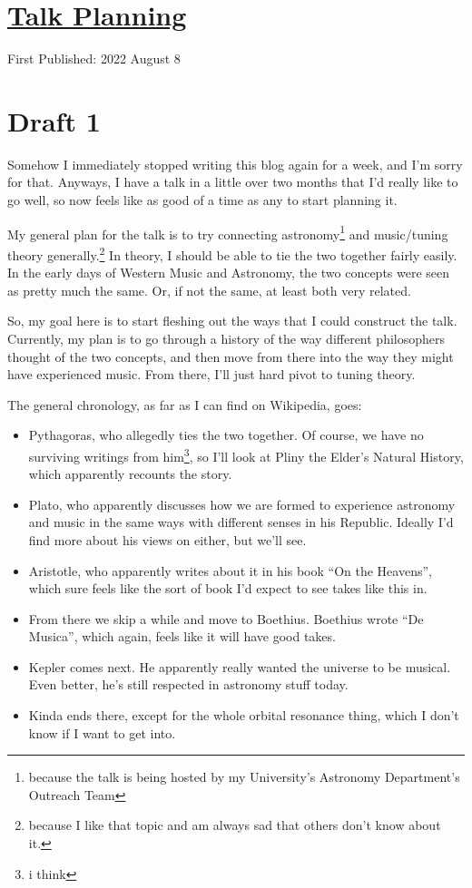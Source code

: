 \documentclass[12pt]{article}[titlepage]
\newcommand{\say}[1]{``#1''}
\newcommand{\1}{\={a}}
\newcommand{\2}{\={e}}
\newcommand{\3}{\={\i}}
\newcommand{\4}{\=o}
\newcommand{\5}{\=u}
\newcommand{\6}{\={A}}
\renewcommand{\,}{\textsuperscript{,}}
\begin{document}
\doublespacing
\section{\href{talk-planning-1.html}{Talk Planning}}
First Published: 2022 August 8
\section{Draft 1}
Somehow I immediately stopped writing this blog again for a week, and I'm sorry for that.
Anyways, I have a talk in a little over two months that I'd really like to go well, so now feels like as good of a time as any to start planning it.

My general plan for the talk is to try connecting astronomy\footnote{because the talk is being hosted by my University's Astronomy Department's Outreach Team} and music/tuning theory generally.\footnote{because I like that topic and am always sad that others don't know about it.}
In theory, I should be able to tie the two together fairly easily.
In the early days of Western Music and Astronomy, the two concepts were seen as pretty much the same.
Or, if not the same, at least both very related.

So, my goal here is to start fleshing out the ways that I could construct the talk.
Currently, my plan is to go through a history of the way different philosophers thought of the two concepts, and then move from there into the way they might have experienced music.
From there, I'll just hard pivot to tuning theory.

The general chronology, as far as I can find on Wikipedia, goes:
\begin{itemize}
\item Pythagoras, who allegedly ties the two together. Of course, we have no surviving writings from him\footnote{i think}, so I'll look at Pliny the Elder's Natural History, which apparently recounts the story.
\item Plato, who apparently discusses how we are formed to experience astronomy and music in the same ways with different senses in his Republic. Ideally I'd find more about his views on either, but we'll see.
\item Aristotle, who apparently writes about it in his book \say{On the Heavens}, which sure feels like the sort of book I'd expect to see takes like this in.
\item From there we skip a while and move to Boethius. Boethius wrote \say{De Musica}, which again, feels like it will have good takes.
\item Kepler comes next. He apparently really wanted the universe to be musical. Even better, he's still respected in astronomy stuff today.
\item Kinda ends there, except for the whole orbital resonance thing, which I don't know if I want to get into.
\end{itemize}
\end{document}
